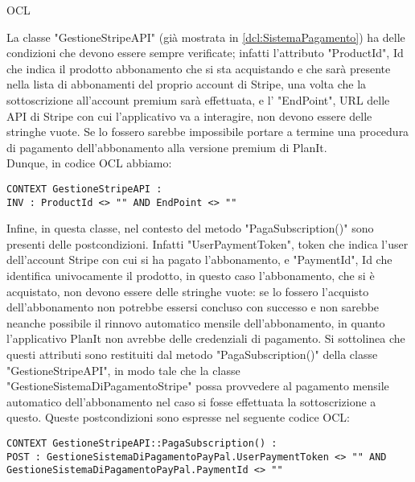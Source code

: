 \begin{listaPersonale}{OCL}
    \begin{center}
        
    \end{center}
    La classe "GestioneStripeAPI" (già mostrata in \ref{dcl:SistemaPagamento}) ha delle condizioni che devono essere sempre verificate; infatti l'attributo "ProductId", Id che indica il prodotto abbonamento che si sta acquistando e che sarà presente nella lista di abbonamenti del proprio account di Stripe, una volta che la sottoscrizione all'account premium sarà effettuata, e l' "EndPoint", URL delle API di Stripe con cui l'applicativo va a interagire, non devono essere delle stringhe vuote. Se lo fossero sarebbe impossibile portare a termine una procedura di pagamento dell'abbonamento alla versione premium di PlanIt. \\
    Dunque, in codice OCL abbiamo:
    \begin{lstlisting}
CONTEXT GestioneStripeAPI :
INV : ProductId <> "" AND EndPoint <> ""
    \end{lstlisting}
    Infine, in questa classe, nel contesto del metodo "PagaSubscription()" sono presenti delle postcondizioni. Infatti "UserPaymentToken", token che indica l'user dell'account Stripe con cui si ha pagato l'abbonamento, e "PaymentId", Id che identifica univocamente il prodotto, in questo caso l'abbonamento, che si è acquistato, non devono essere delle stringhe vuote: se lo fossero l'acquisto dell'abbonamento non potrebbe essersi concluso con successo e non sarebbe neanche possibile il rinnovo automatico mensile dell'abbonamento, in quanto l'applicativo PlanIt non avrebbe delle credenziali di pagamento. Si sottolinea che questi attributi sono restituiti dal metodo "PagaSubscription()" della classe "GestioneStripeAPI", in modo tale che la classe "GestioneSistemaDiPagamentoStripe" possa provvedere al pagamento mensile automatico dell'abbonamento nel caso si fosse effettuata la sottoscrizione a questo.
    Queste postcondizioni sono espresse nel seguente codice OCL:
    \begin{lstlisting}
CONTEXT GestioneStripeAPI::PagaSubscription() :
POST : GestioneSistemaDiPagamentoPayPal.UserPaymentToken <> "" AND GestioneSistemaDiPagamentoPayPal.PaymentId <> ""
    \end{lstlisting}





\end{listaPersonale}
